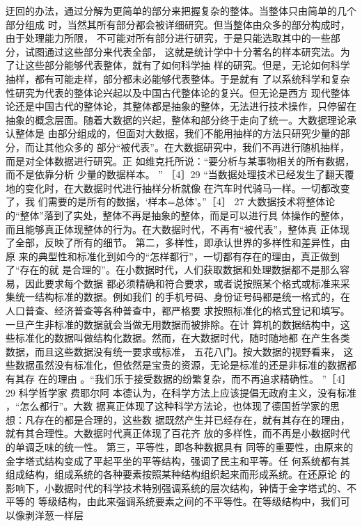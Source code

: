 \documentclass[11pt]{ctexart}
\begin{document}
{{{{迂回的办法，通过分解为更简单的部分来把握复杂的整体。当整体只由简单的几个部分组成
时，当然其所有部分都会被详细研究。但当整体由众多的部分构成时，由于处理能力所限，
不可能对所有部分进行研究，于是只能选取其中的一些部分，试图通过这些部分来代表全部，
这就是统计学中十分著名的样本研究法。为了让这些部分能够代表整体，就有了如何科学抽
样的研究。但是，无论如何科学抽样，都有可能走样，部分都未必能够代表整体。于是就有
了以系统科学和复杂性研究为代表的整体论兴起以及中国古代整体论的复兴。但无论是西方
现代整体论还是中国古代的整体论，其整体都是抽象的整体，无法进行技术操作，只停留在
抽象的概念层面。随着大数据的兴起，整体和部分终于走向了统一。大数据理论承认整体是
由部分组成的，但面对大数据，我们不能用抽样的方法只研究少量的部分，而让其他众多的
部分“被代表”。在大数据研究中，我们不再进行随机抽样，而是对全体数据进行研究。正
如维克托所说：“要分析与某事物相关的所有数据，而不是依靠分析 少量的数据样本。 ”
［4］29 “当数据处理技术已经发生了翻天覆地的变化时，在大数据时代进行抽样分析就像
在汽车时代骑马一样。一切都改变了，我 们需要的是所有的数据，‘样本=总体’。”［4］
27 大数据技术将整体论的“整体”落到了实处，整体不再是抽象的整体，而是可以进行具
体操作的整体，而且能够真正体现整体的行为。在大数据时代，不再有“被代表”，整体真
正体现了全部，反映了所有的细节。 第二，多样性，即承认世界的多样性和差异性，由原
来的典型性和标准化到如今的“怎样都行”，一切都有存在的理由，真正做到了“存在的就
是合理的”。在小数据时代，人们获取数据和处理数据都不是那么容易，因此要求每个数据
都必须精确和符合要求，或者说按照某个格式或标准来采集统一结构标准的数据。例如我们
的手机号码、身份证号码都是统一格式的，在人口普查、经济普查等各种普查中，都严格要
求按照标准化的格式登记和填写。一旦产生非标准的数据就会当做无用数据而被排除。在计
算机的数据结构中，这些标准化的数据叫做结构化数据。然而，在大数据时代，随时随地都
在产生各类数据，而且这些数据没有统一要求或标准， 五花八门。按大数据的视野看来，
这些数据虽然没有标准化，但依然是宝贵的资源，无论是标准的还是非标准的数据都有其存
在的理由 。“我们乐于接受数据的纷繁复杂，而不再追求精确性。 ”［4］29 科学哲学家
费耶尔阿 本德认为，在科学方法上应该提倡无政府主义，没有标准 ，“怎么都行”。大数
据真正体现了这种科学方法论，也体现了德国哲学家的思想：凡存在的都是合理的，这些数
据既然产生并已经存在，就有其存在的理由，就有其合理性。大数据时代真正体现了百花齐
放的多样性，而不再是小数据时代的单调乏味的统一性。 第三，平等性，即各种数据具有
同等的重要性，由原来的金字塔式结构变成了平起平坐的平等结构，强调了民主和平等。任
何系统都有其组成结构，组成系统的各种要素按照某种结构组织起来而形成系统。在还原论
的影响下，小数据时代的科学技术特别强调系统的层次结构，钟情于金字塔式的、不平等的
等级结构，由此来强调系统要素之间的不平等性。在等级结构中，我们可以像剥洋葱一样层
}}}}
\end{document}
